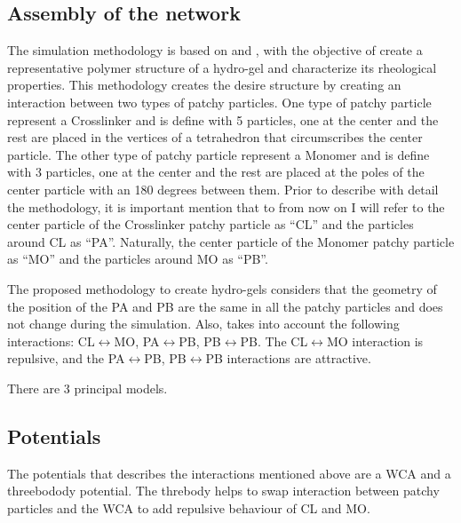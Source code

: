 \documentclass[../main.tex]{subfiles}
\begin{document}
\subsection{Assembly of the network}\label{sec:descriptionSimulation}

The simulation methodology is based on \cite{gnanSilicoSynthesisMicrogel2017} and \cite{sorichettiStructureElasticityModel2023}, with the objective of create a representative polymer structure of a hydro-gel and characterize its rheological properties.
This methodology creates the desire structure by creating an interaction between two types of patchy particles.
One type of patchy particle represent a Crosslinker and is define with 5 particles, one at the center and the rest are placed in the vertices of a tetrahedron that circumscribes the center particle.
The other type of patchy particle represent a Monomer and is define with 3 particles, one at the center and the rest are placed at the poles of the center particle with an 180 degrees between them.
Prior to describe with detail the methodology, it is important mention that to from now on I will refer to the center particle of the Crosslinker patchy particle as ``CL'' and the particles around CL as ``PA''.
Naturally, the center particle of the Monomer patchy particle as ``MO'' and the particles around MO as ``PB''.

The proposed methodology to create hydro-gels considers that the geometry of the position of the PA and PB are the same in all the patchy particles and does not change during the simulation.
Also, takes into account the following interactions: CL$\longleftrightarrow$MO, PA$\longleftrightarrow$PB, PB$\longleftrightarrow$PB.
The CL$\longleftrightarrow$MO interaction is repulsive, and the PA$\longleftrightarrow$PB, PB$\longleftrightarrow$PB interactions are attractive.

There are 3 principal models.



\subsection{Potentials}\label{subsec:Potentials}

The potentials that describes the interactions mentioned above are a WCA and a threebodody potential.
The threbody helps to swap interaction between patchy particles and the WCA to add repulsive behaviour of CL and MO.
\end{document}
